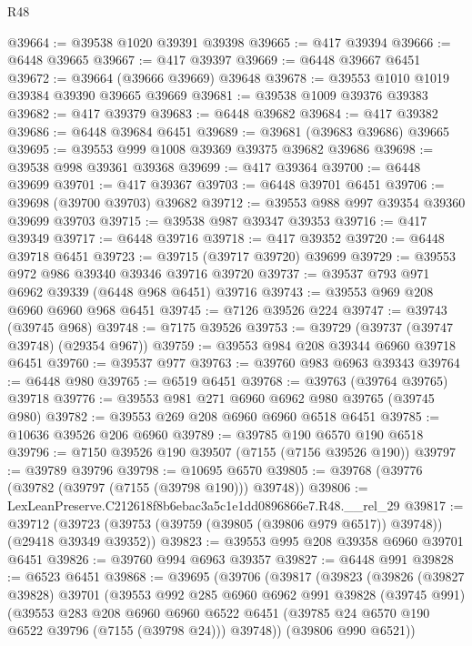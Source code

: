 \begin{lexlean}{R48}
\begin{coremodule}
@39664 := @39538 @1020 @39391 @39398
@39665 := @417 @39394
@39666 := @6448 @39665
@39667 := @417 @39397
@39669 := @6448 @39667 @6451
@39672 := @39664 (@39666 @39669) @39648
@39678 := @39553 @1010 @1019 @39384 @39390 @39665 @39669
@39681 := @39538 @1009 @39376 @39383
@39682 := @417 @39379
@39683 := @6448 @39682
@39684 := @417 @39382
@39686 := @6448 @39684 @6451
@39689 := @39681 (@39683 @39686) @39665
@39695 := @39553 @999 @1008 @39369 @39375 @39682 @39686
@39698 := @39538 @998 @39361 @39368
@39699 := @417 @39364
@39700 := @6448 @39699
@39701 := @417 @39367
@39703 := @6448 @39701 @6451
@39706 := @39698 (@39700 @39703) @39682
@39712 := @39553 @988 @997 @39354 @39360 @39699 @39703
@39715 := @39538 @987 @39347 @39353
@39716 := @417 @39349
@39717 := @6448 @39716
@39718 := @417 @39352
@39720 := @6448 @39718 @6451
@39723 := @39715 (@39717 @39720) @39699
@39729 := @39553 @972 @986 @39340 @39346 @39716 @39720
@39737 := @39537 @793 @971 @6962 @39339 (@6448 @968 @6451) @39716
@39743 := @39553 @969 @208 @6960 @6960 @968 @6451
@39745 := @7126 @39526 @224
@39747 := @39743 (@39745 @968)
@39748 := @7175 @39526
@39753 := @39729 (@39737 (@39747 @39748) (@29354 @967))
@39759 := @39553 @984 @208 @39344 @6960 @39718 @6451
@39760 := @39537 @977
@39763 := @39760 @983 @6963 @39343
@39764 := @6448 @980
@39765 := @6519 @6451
@39768 := @39763 (@39764 @39765) @39718
@39776 := @39553 @981 @271 @6960 @6962 @980 @39765 (@39745 @980)
@39782 := @39553 @269 @208 @6960 @6960 @6518 @6451
@39785 := @10636 @39526 @206 @6960
@39789 := @39785 @190 @6570 @190 @6518
@39796 := @7150 @39526 @190 @39507 (@7155 (@7156 @39526 @190))
@39797 := @39789 @39796
@39798 := @10695 @6570
@39805 := @39768 (@39776 (@39782 (@39797 (@7155 (@39798 @190))) @39748))
@39806 := LexLeanPreserve.C212618f8b6ebac3a5c1e1dd0896866e7.R48.__rel_29
@39817 := @39712
    (@39723 (@39753 (@39759 (@39805 (@39806 @979 @6517)) @39748)) (@29418 @39349 @39352))
@39823 := @39553 @995 @208 @39358 @6960 @39701 @6451
@39826 := @39760 @994 @6963 @39357
@39827 := @6448 @991
@39828 := @6523 @6451
@39868 := @39695
    (@39706
      (@39817
        (@39823
          (@39826
            (@39827 @39828)
            @39701
            (@39553
              @992
              @285
              @6960
              @6962
              @991
              @39828
              (@39745 @991)
              (@39553
                @283
                @208
                @6960
                @6960
                @6522
                @6451
                (@39785 @24 @6570 @190 @6522 @39796 (@7155 (@39798 @24)))
                @39748))
            (@39806 @990 @6521))

\end{coremodule}
\end{lexlean}

